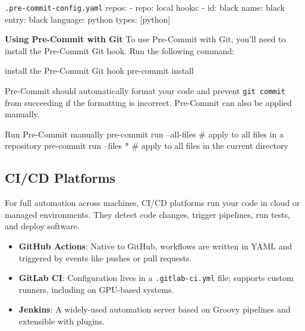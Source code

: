 \begin{codeonly}{\texttt{.pre-commit-config.yaml}}
repos:
  - repo: local
    hooks:
      - id: black
        name: black
        entry: black
        language: python
        types: [python]
\end{codeonly}

\textbf{Using Pre-Commit with Git}
To use Pre-Commit with Git, you'll need to install the Pre-Commit Git hook. Run the following command:

\begin{codeonly}{install the Pre-Commit Git hook}
pre-commit install
\end{codeonly}

Pre-Commit should automatically format your code and prevent \texttt{git commit} from succeeding if the formatting is incorrect. Pre-Commit can also be applied manually.

\begin{codeonly}{Run Pre-Commit manually}
pre-commit run --all-files # apply to all files in a repository
pre-commit run --files *   # apply to all files in the current directory
\end{codeonly}


%
\subsection{CI/CD Platforms}
For full automation across machines, CI/CD platforms run your code in cloud or managed environments. They detect code changes, trigger pipelines, run tests, and deploy software.

\begin{itemize}
\item \textbf{GitHub Actions}: Native to GitHub, workflows are written in YAML and triggered by events like pushes or pull requests.
\item \textbf{GitLab CI}: Configuration lives in a \texttt{.gitlab-ci.yml} file; supports custom runners, including on GPU-based systems.
\item \textbf{Jenkins}: A widely-used automation server based on Groovy pipelines and extensible with plugins.
\end{itemize}

%
